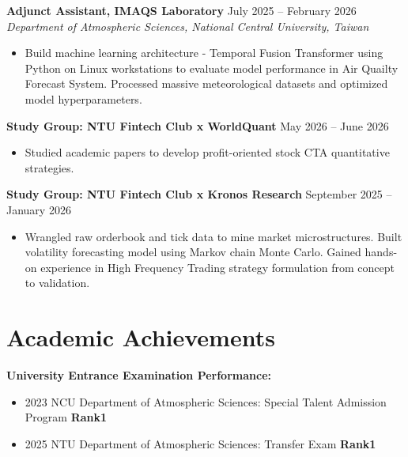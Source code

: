 \documentclass[12pt,a4paper]{article}
\newcommand{\cvitem}[2]{\noindent\textbf{#1} \hfill #2}
\newcommand{\cvsubitem}[1]{\noindent\textit{#1}}
\newcommand{\cvsubbreak}{\\[-2pt]}
\newcommand{\cventrysep}{\vspace{2pt}}
\newcommand{\cvsectionsep}{\vspace{2pt}}
\begin{document}
\cventrysep

\cvitem{Adjunct Assistant, IMAQS Laboratory}{July 2025 -- February 2026}
\cvsubbreak
\cvsubitem{Department of Atmospheric Sciences, National Central University, Taiwan}
\begin{itemize}
\small\linespread{0.85}\selectfont
    \item Build machine learning architecture - Temporal Fusion Transformer using Python on Linux workstations to evaluate model performance in Air Quailty Forecast System. Processed massive meteorological datasets and optimized model hyperparameters.
\end{itemize}

\cventrysep

\cvitem{Study Group: NTU Fintech Club x WorldQuant}{May 2026 -- June 2026}
\begin{itemize}
\small\linespread{0.85}\selectfont
    \item Studied academic papers to develop profit-oriented stock CTA quantitative strategies.
\end{itemize}

\cventrysep

\cvitem{Study Group: NTU Fintech Club x Kronos Research}{September 2025 -- January 2026}
\begin{itemize}
\small\linespread{0.85}\selectfont
    \item Wrangled raw orderbook and tick data to mine market microstructures. Built volatility forecasting model using Markov chain Monte Carlo. Gained hands-on experience in High Frequency Trading strategy formulation from concept to validation.
\end{itemize}

\cvsectionsep

\section{Academic Achievements}

\noindent\textbf{University Entrance Examination Performance:}
\begin{itemize}
    \item 2023 NCU Department of Atmospheric Sciences: Special Talent Admission Program \textbf{Rank1}
    \item 2025 NTU Department of Atmospheric Sciences: Transfer Exam \textbf{Rank1}
\end{itemize}

\cventrysep
\end{document}
